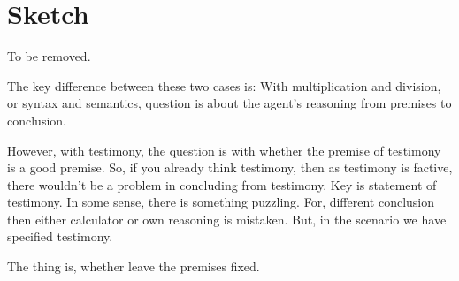 \chapter{Sketch}
\label{cha:sketch}

{
  \color{red}
  To be removed.
}

\begin{note}
  The key difference between these two cases is:
  With multiplication and division, or syntax and semantics, question is about the agent's reasoning from premises to conclusion.

  However, with testimony, the question is with whether the premise of testimony is a good premise.
  So, if you already think testimony, then as testimony is factive, there wouldn't be a problem in concluding from testimony.
  Key is statement of testimony.
  In some sense, there is something puzzling.
  For, different conclusion then either calculator or own reasoning is mistaken.
  But, in the scenario we have specified testimony.

  The thing is, whether leave the premises fixed.
\end{note}

